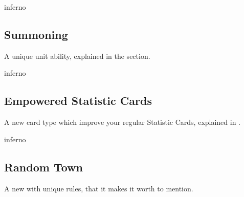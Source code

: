 \begin{multicols*}{2}
\vspace*{1em}
\begin{expansion}{inferno}
	\subsection*{Summoning}
	A unique unit ability, explained in the  section.
\end{expansion}

\vspace*{1em}
\begin{expansion}{inferno}
	\subsection*{Empowered Statistic Cards}
	A new card type which improve your regular Statistic Cards, explained in .
\end{expansion}

\vspace*{1em}
\begin{expansion}{inferno}
	\subsection*{Random Town}
	A new  with unique rules, that it makes it worth to mention.
\end{expansion}
\end{multicols*}

